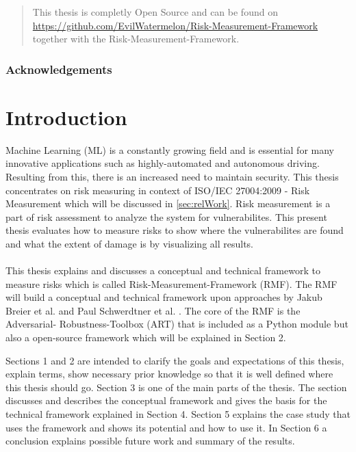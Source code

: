 \begin{abstract}
This thesis is completly Open Source and can be found on \url{https://github.com/EvilWatermelon/Risk-Measurement-Framework} together with the Risk-Measurement-Framework.
\end{abstract}

\subsubsection*{Acknowledgements}

\newpage

\section{Introduction}
\label{sec:intro}

Machine Learning (ML) is a constantly growing field and is essential for many innovative applications such as highly-automated and autonomous driving. Resulting from this,
there is an increased need to maintain security. This thesis concentrates on risk measuring in context of ISO/IEC 27004:2009 - Risk Measurement which will be discussed in \ref{sec:relWork}. Risk
measurement is a part of risk assessment to analyze the system for vulnerabilites. This present thesis evaluates how to measure risks to show where the vulnerabilites are found and what the extent of
damage is by visualizing all results. \\ \\
This thesis explains and discusses a conceptual and technical framework to measure risks which is called Risk-Measurement-Framework (RMF). The RMF will build a conceptual and technical
framework upon approaches by Jakub Breier et al. \cite{DBLP:journals/corr/abs-2012-04884} and Paul Schwerdtner et al. \cite{DBLP:journals/corr/abs-2011-04328}. The core of the RMF is the Adversarial-
Robustness-Toolbox (ART) that is included as a Python module but also a open-source framework which will be explained in Section 2.

Sections 1 and 2 are intended to clarify the goals and expectations of this thesis, explain terms, show necessary prior knowledge so that it is well defined where this thesis should go. Section 3 is one
of the main parts of the thesis. The section discusses and describes the conceptual framework and gives the basis for the technical framework explained in Section 4. Section 5 explains the case study
that uses the framework and shows its potential and how to use it. In Section 6 a conclusion explains possible future work and summary of the results.

